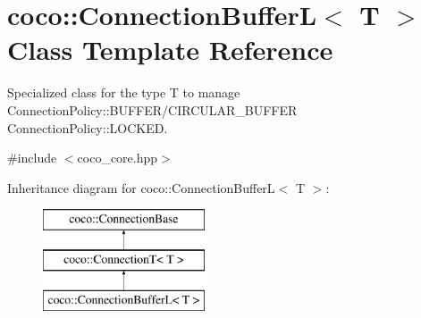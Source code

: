 \hypertarget{classcoco_1_1_connection_buffer_l}{}\section{coco\+:\+:Connection\+Buffer\+L$<$ T $>$ Class Template Reference}
\label{classcoco_1_1_connection_buffer_l}


Specialized class for the type T to manage Connection\+Policy\+::\+B\+U\+F\+F\+E\+R/\+C\+I\+R\+C\+U\+L\+A\+R\+\_\+\+B\+U\+F\+F\+E\+R Connection\+Policy\+::\+L\+O\+C\+K\+E\+D.  




{\ttfamily \#include $<$coco\+\_\+core.\+hpp$>$}

Inheritance diagram for coco\+:\+:Connection\+Buffer\+L$<$ T $>$\+:\begin{figure}[H]
\begin{center}
\leavevmode
\includegraphics[height=3.000000cm]{classcoco_1_1_connection_buffer_l}
\end{center}
\end{figure}
